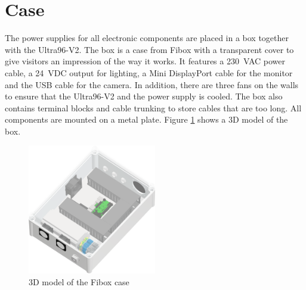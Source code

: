 \section{Case}
\label{sec:hardware:case}

The power supplies for all electronic components are placed in a box together with the Ultra96-V2.
The box is a case from Fibox with a transparent cover to give visitors an impression of the way it works.
It features a \SI{230}{VAC} power cable, a \SI{24}{VDC} output for lighting, a Mini DisplayPort cable for the monitor and the USB cable for the camera.
In addition, there are three fans on the walls to ensure that the Ultra96-V2 and the power supply is cooled.
The box also contains terminal blocks and cable trunking to store cables that are too long.
All components are mounted on a metal plate.
Figure \ref{fig:fibox3d} shows a 3D model of the box. 

\begin{figure}[h]
	\centering
	\includegraphics[width=0.5\textwidth]{graphics/case.png}
	\caption{3D model of the Fibox case}
	\label{fig:fibox3d}
\end{figure}
